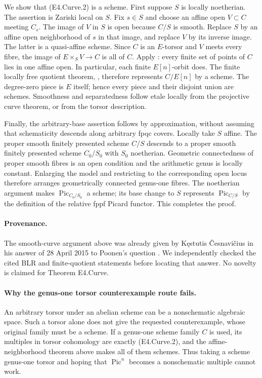 We show that (E4.Curve.2) is a scheme. First suppose $S$ is locally
noetherian. The assertion is Zariski local on $S$. Fix $s\in S$ and
choose an affine open $V\subset C$ meeting $C_s$. The image of $V$
in $S$ is open because $C/S$ is smooth. Replace $S$ by an affine open
neighborhood of $s$ in that image, and replace $V$ by its inverse
image. The latter is a quasi-affine scheme. Since $C$ is an $E$-torsor
and $V$ meets every fibre, the image of $E\times_S V\to C$ is all of
$C$. Apply \cite[\S6.6, Theorem~2(c), pp.~164--166]{BCEBLR1990}:
every finite set of points of $C$ lies in one affine open. In
particular, each finite $E[n]$-orbit does. The finite locally free
quotient theorem, \cite[Proposition~66.14.1, tag~07S6]{BCEStacksFiniteQuotient},
therefore represents $C/E[n]$ by a scheme. The degree-zero piece is
$E$ itself; hence every piece and their disjoint union are schemes.
Smoothness and separatedness follow etale locally from the projective
curve theorem, or from the torsor description.

Finally, the arbitrary-base assertion follows by approximation,
without assuming that schematicity descends along arbitrary fpqc
covers. Locally take $S$ affine. The proper smooth finitely presented
scheme $C/S$ descends to a proper smooth finitely presented scheme
$C_0/S_0$ with $S_0$ noetherian. Geometric connectedness of proper
smooth fibres is an open condition and the arithmetic genus is
locally constant. Enlarging the model and restricting to the
corresponding open locus therefore arranges geometrically connected
genus-one fibres. The noetherian argument makes
$\operatorname{Pic}_{C_0/S_0}$ a scheme; its base change to $S$ represents
$\operatorname{Pic}_{C/S}$ by the definition of the relative fppf
Picard functor. This completes the proof.

\paragraph{Provenance.}
The smooth-curve argument above was already given by K\k{e}stutis
\v{C}esnavi\v{c}ius in his answer of 28 April 2015 to Poonen's question
\cite{BCECesnavicius2015}. We independently checked the cited BLR and
finite-quotient statements before locating that answer. No novelty is
claimed for Theorem E4.Curve.

\paragraph{Why the genus-one torsor counterexample route fails.}
An arbitrary torsor under an abelian scheme can be a nonschematic
algebraic space. Such a torsor alone does not give the requested
counterexample, whose original family must be a scheme. If a genus-one
scheme family $C$ is used, its multiples in torsor cohomology are
exactly (E4.Curve.2), and the affine-neighborhood theorem above makes
all of them schemes. Thus taking a scheme genus-one torsor and hoping
that $\operatorname{Pic}^n$ becomes a nonschematic multiple cannot work.

